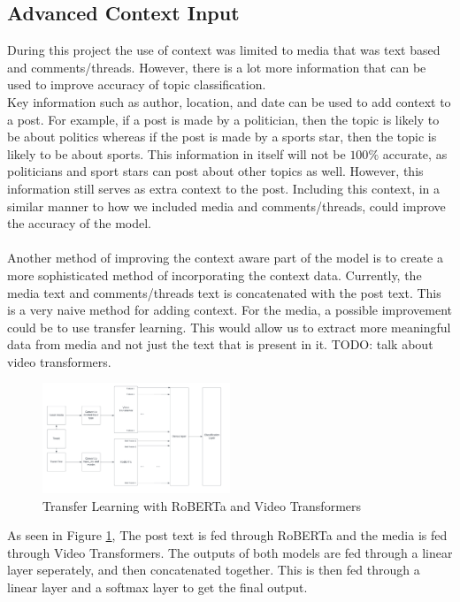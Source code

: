 \subsection{Advanced Context Input}
During this project the use of context was limited to media that was text based and comments/threads. However, there is a lot more information that can
be used to improve accuracy of topic classification.\\
Key information such as author, location, and date can be used to add context to a post. For example, if a post is made by a politician, then the topic is
likely to be about politics whereas if the post is made by a sports star, then the topic is likely to be about sports. This information in itself will not
be $100\%$ accurate, as politicians and sport stars can post about other topics as well. However, this information still serves as extra context to the post.
Including this context, in a similar manner to how we included media and comments/threads, could improve the accuracy of the model.\\\\
Another method of improving the context aware part of the model is to create a more sophisticated method of incorporating the context data. Currently, the
media text and comments/threads text is concatenated with the post text. This is a very naive method for adding context. For the media, a possible improvement
could be to use transfer learning. This would allow us to extract more meaningful data from media and not just the text that is present in it. TODO: talk about 
video transformers.
\begin{figure}
    \centering
    \includegraphics[width=0.5\textwidth]{images/transfer-learning.png}
    \caption{Transfer Learning with RoBERTa and Video Transformers}
    \label{fig:transfer-learning}
\end{figure}
As seen in Figure \ref{fig:transfer-learning}, The post text is fed through RoBERTa and the media is fed through Video Transformers. The outputs of both models
are fed through a linear layer seperately, and then concatenated together. This is then fed through a linear layer and a softmax layer to get the final output.
